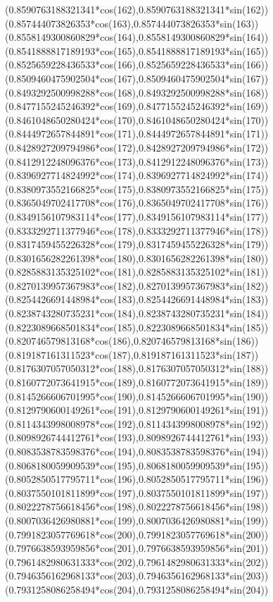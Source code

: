 {({0.8590763188321341*cos(162)},{0.8590763188321341*sin(162)})
({0.857444073826353*cos(163)},{0.857444073826353*sin(163)})
({0.8558149300860829*cos(164)},{0.8558149300860829*sin(164)})
({0.8541888817189193*cos(165)},{0.8541888817189193*sin(165)})
({0.8525659228436533*cos(166)},{0.8525659228436533*sin(166)})
({0.8509460475902504*cos(167)},{0.8509460475902504*sin(167)})
({0.8493292500998288*cos(168)},{0.8493292500998288*sin(168)})
({0.8477155245246392*cos(169)},{0.8477155245246392*sin(169)})
({0.8461048650280424*cos(170)},{0.8461048650280424*sin(170)})
({0.8444972657844891*cos(171)},{0.8444972657844891*sin(171)})
({0.8428927209794986*cos(172)},{0.8428927209794986*sin(172)})
({0.8412912248096376*cos(173)},{0.8412912248096376*sin(173)})
({0.8396927714824992*cos(174)},{0.8396927714824992*sin(174)})
({0.8380973552166825*cos(175)},{0.8380973552166825*sin(175)})
({0.8365049702417708*cos(176)},{0.8365049702417708*sin(176)})
({0.8349156107983114*cos(177)},{0.8349156107983114*sin(177)})
({0.8333292711377946*cos(178)},{0.8333292711377946*sin(178)})
({0.8317459455226328*cos(179)},{0.8317459455226328*sin(179)})
({0.8301656282261398*cos(180)},{0.8301656282261398*sin(180)})
({0.8285883135325102*cos(181)},{0.8285883135325102*sin(181)})
({0.8270139957367983*cos(182)},{0.8270139957367983*sin(182)})
({0.8254426691448984*cos(183)},{0.8254426691448984*sin(183)})
({0.8238743280735231*cos(184)},{0.8238743280735231*sin(184)})
({0.8223089668501834*cos(185)},{0.8223089668501834*sin(185)})
({0.820746579813168*cos(186)},{0.820746579813168*sin(186)})
({0.819187161311523*cos(187)},{0.819187161311523*sin(187)})
({0.8176307057050312*cos(188)},{0.8176307057050312*sin(188)})
({0.8160772073641915*cos(189)},{0.8160772073641915*sin(189)})
({0.8145266606701995*cos(190)},{0.8145266606701995*sin(190)})
({0.8129790600149261*cos(191)},{0.8129790600149261*sin(191)})
({0.8114343998008978*cos(192)},{0.8114343998008978*sin(192)})
({0.8098926744412761*cos(193)},{0.8098926744412761*sin(193)})
({0.8083538783598376*cos(194)},{0.8083538783598376*sin(194)})
({0.8068180059909539*cos(195)},{0.8068180059909539*sin(195)})
({0.8052850517795711*cos(196)},{0.8052850517795711*sin(196)})
({0.8037550101811899*cos(197)},{0.8037550101811899*sin(197)})
({0.8022278756618456*cos(198)},{0.8022278756618456*sin(198)})
({0.8007036426980881*cos(199)},{0.8007036426980881*sin(199)})
({0.7991823057769618*cos(200)},{0.7991823057769618*sin(200)})
({0.7976638593959856*cos(201)},{0.7976638593959856*sin(201)})
({0.7961482980631333*cos(202)},{0.7961482980631333*sin(202)})
({0.7946356162968133*cos(203)},{0.7946356162968133*sin(203)})
({0.7931258086258494*cos(204)},{0.7931258086258494*sin(204)})
}
